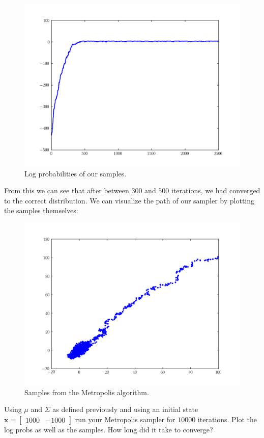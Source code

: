 \begin{figure}[h]
\centering
\includegraphics[width=\textwidth]{logprobs.pdf}
\caption{Log probabilities of our samples.}
\end{figure}

From this we can see that after between $300$ and $500$ iterations, we had converged to the correct distribution. We can visualize the path of our sampler by plotting the samples themselves:
\begin{figure}[h]
\centering
\includegraphics[width=\textwidth]{samples.pdf}
\caption{Samples from the Metropolis algorithm.}
\end{figure}

\begin{problem}
Using $\mu$ and $\Sigma$ as defined previously and using an initial state $\mathbf{x} = \left[ \begin{array}{cc} 1000 & -1000 \end{array} \right]$ run your Metropolis sampler for $10000$ iterations. Plot the log probs as well as the samples. How long did it take to converge?
\end{problem}

